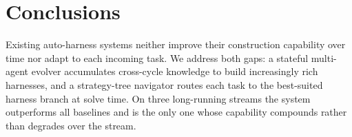 
\section{Conclusions}
\label{sec:conclusions}

Existing auto-harness systems neither improve their construction capability over time nor adapt to each incoming task. We address both gaps: a stateful multi-agent evolver accumulates cross-cycle knowledge to build increasingly rich harnesses, and a strategy-tree navigator routes each task to the best-suited harness branch at solve time. On three long-running streams the system outperforms all baselines and is the only one whose capability compounds rather than degrades over the stream.
